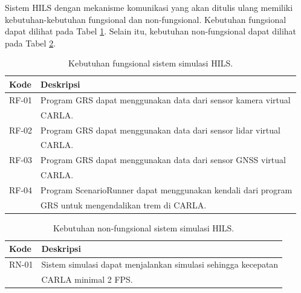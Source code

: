 Sistem HILS dengan mekanisme komunikasi yang akan ditulis ulang memiliki
kebutuhan-kebutuhan fungsional dan non-fungsional. Kebutuhan fungsional dapat
dilihat pada Tabel \ref{chapter-3-tbl-functional-requirement}. Selain itu,
kebutuhan non-fungsional dapat dilihat pada Tabel
\ref{chapter-3-tbl-non-functional-requirement}.
\begin{table}[!htbp]
	\centering
	\begin{tabular}{|l|l|}
		\hline
		\textbf{Kode} & \textbf{Deskripsi}                                            \\
		\hline
		RF-01         & Program GRS dapat menggunakan data dari sensor kamera virtual \\
		              & CARLA.                                                        \\
		\hline
		RF-02         & Program GRS dapat menggunakan data dari sensor lidar virtual  \\
		              & CARLA.                                                        \\
		\hline
		RF-03         & Program GRS dapat menggunakan data dari sensor GNSS virtual   \\
		              & CARLA.                                                        \\
		\hline
		RF-04         & Program ScenarioRunner dapat menggunakan kendali dari program \\
		              & GRS untuk mengendalikan trem di CARLA.                        \\
		\hline
	\end{tabular}
	\caption{Kebutuhan fungsional sistem simulasi HILS.}
	\label{chapter-3-tbl-functional-requirement}
\end{table}

\begin{table}[!htbp]
	\centering
	\begin{tabular}{|l|l|}
		\hline
		\textbf{Kode} & \textbf{Deskripsi}                                            \\
		\hline
		RN-01         & Sistem simulasi dapat menjalankan simulasi sehingga kecepatan \\
		              & CARLA minimal 2 FPS.                                          \\
		\hline
	\end{tabular}
	\caption{Kebutuhan non-fungsional sistem simulasi HILS.}
	\label{chapter-3-tbl-non-functional-requirement}
\end{table}

